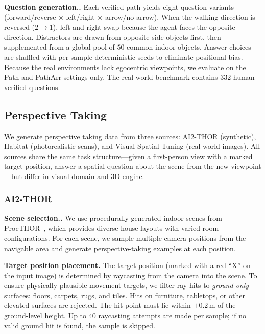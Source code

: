 \documentclass{llmxive}
\providecommand{\paragraph}[1]{\vspace{.5em}\noindent\textbf{#1.}}
\begin{document}
\paragraph{Question generation.}
Each verified path yields eight question variants (forward/reverse $\times$ left/right $\times$ arrow/no-arrow).
When the walking direction is reversed ($2 \to 1$), left and right swap because the agent faces the opposite direction.
Distractors are drawn from opposite-side objects first, then supplemented from a global pool of $50$ common indoor objects.
Answer choices are shuffled with per-sample deterministic seeds to eliminate positional bias.
Because the real environments lack egocentric viewpoints, we evaluate on the Path and PathArr settings only.
The real-world benchmark contains $332$ human-verified questions.

\subsection{Perspective Taking}
\label{supp_data_pet}

We generate perspective taking data from three sources: AI2-THOR (synthetic), Habitat (photorealistic scans), and Visual Spatial Tuning (real-world images).
All sources share the same task structure---given a first-person view with a marked target position, answer a spatial question about the scene from the new viewpoint---but differ in visual domain and 3D engine.

\subsubsection{AI2-THOR}

\paragraph{Scene selection.}
We use procedurally generated indoor scenes from ProcTHOR~\cite{deitke2022procthor}, which provides diverse house layouts with varied room configurations.
For each scene, we sample multiple camera positions from the navigable area and generate perspective-taking examples at each position.

\noindent\textbf{Target position placement.}
The target position (marked with a red ``X'' on the input image) is determined by raycasting from the camera into the scene.
To ensure physically plausible movement targets, we filter ray hits to \emph{ground-only} surfaces: floors, carpets, rugs, and tiles.
Hits on furniture, tabletops, or other elevated surfaces are rejected.
The hit point must lie within $\pm0.2$\,m of the ground-level height.
Up to 40 raycasting attempts are made per sample; if no valid ground hit is found, the sample is skipped.
\end{document}
